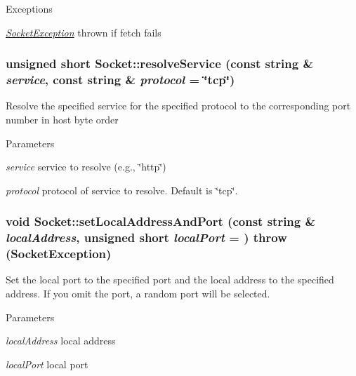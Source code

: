 \begin{DoxyExceptions}{Exceptions}
\item[{\em \hyperlink{classSocketException}{SocketException}}]thrown if fetch fails \end{DoxyExceptions}
\hypertarget{classSocket_a982c63b25c5b756321a74074a275adbc}{
\subsubsection[{resolveService}]{\setlength{\rightskip}{0pt plus 5cm}unsigned short Socket::resolveService (const string \& {\em service}, \/  const string \& {\em protocol} = {\ttfamily \char`\"{}tcp\char`\"{}})}}
\label{classSocket_a982c63b25c5b756321a74074a275adbc}
Resolve the specified service for the specified protocol to the corresponding port number in host byte order 
\begin{DoxyParams}{Parameters}
\item[{\em service}]service to resolve (e.g., \char`\"{}http\char`\"{}) \item[{\em protocol}]protocol of service to resolve. Default is \char`\"{}tcp\char`\"{}. \end{DoxyParams}
\hypertarget{classSocket_aa6b986410bc2e606ba27d01fa7cb8836}{
\subsubsection[{setLocalAddressAndPort}]{\setlength{\rightskip}{0pt plus 5cm}void Socket::setLocalAddressAndPort (const string \& {\em localAddress}, \/  unsigned short {\em localPort} = {})  throw ({\bf SocketException})}}
\label{classSocket_aa6b986410bc2e606ba27d01fa7cb8836}
Set the local port to the specified port and the local address to the specified address. If you omit the port, a random port will be selected. 
\begin{DoxyParams}{Parameters}
\item[{\em localAddress}]local address \item[{\em localPort}]local port \end{DoxyParams}

